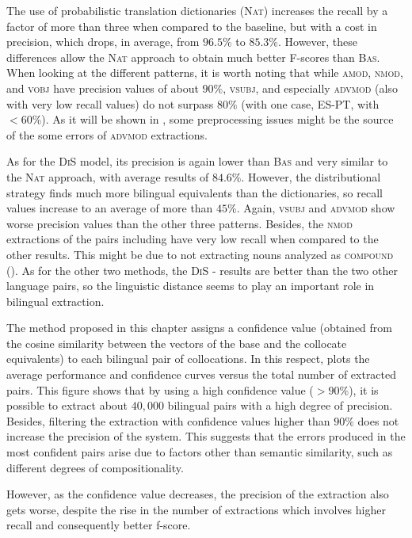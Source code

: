 \documentclass[output=paper,modfonts,nonflat]{langsci/langscibook}
\begin{document}
The use of probabilistic translation dictionaries (\textsc{Nat}) increases the recall
by a factor of more than three when compared to the baseline, but with a cost in precision, which drops, in average, from $96.5\%$ to $85.3\%$. However, these differences
allow the \textsc{Nat} approach to obtain much better F-scores than \textsc{Bas}. When looking at the different  patterns, it is worth noting
that while \textsc{amod, nmod}, and \textsc{vobj} have precision values of about $90\%$,
\textsc{vsubj}, and especially \textsc{advmod} (also with very low recall values)
do not surpass $80\%$ (with one case, ES-PT, with $<60\%$). As it will be shown
in , some preprocessing issues might be the source of the some
errors of \textsc{advmod} extractions.

As for the \textsc{DiS} model, its precision is again lower than \textsc{Bas} and very similar
to the \textsc{Nat} approach, with average results of $84.6\%$. However, the distributional
strategy finds much more bilingual equivalents than the dictionaries, so
recall values increase to an average of more than $45\%$. Again, \textsc{vsubj} and
\textsc{advmod} show worse precision values than the other three patterns.
Besides, the \textsc{nmod} extractions of the pairs including  have very low recall
when compared to the other results. This might be due to not extracting nouns analyzed as \textsc{compound} ().
As for the other two methods, the \textsc{DiS} - results are better than the two
other language pairs, so the linguistic distance seems to play an important role in bilingual
 extraction.

The method proposed in this chapter assigns a confidence value (obtained from the cosine
similarity between the vectors of the base and the collocate equivalents)
to each bilingual pair of collocations. In this respect,  plots
the average performance and confidence curves versus the total number of extracted pairs.
This figure shows that by using a high confidence value ($>90\%$), it is possible
to extract about $40,000$ bilingual pairs with a high degree of precision. Besides, filtering the extraction with confidence values higher than
$90\%$ does not increase the precision of the system. 
This suggests that the errors produced in the most confident pairs arise due to factors other than semantic similarity, such as different degrees of compositionality.

However, as the confidence value decreases,
the precision of the extraction also gets worse, despite the rise in the number of extractions
which involves higher recall and consequently better f-score.
\end{document}
